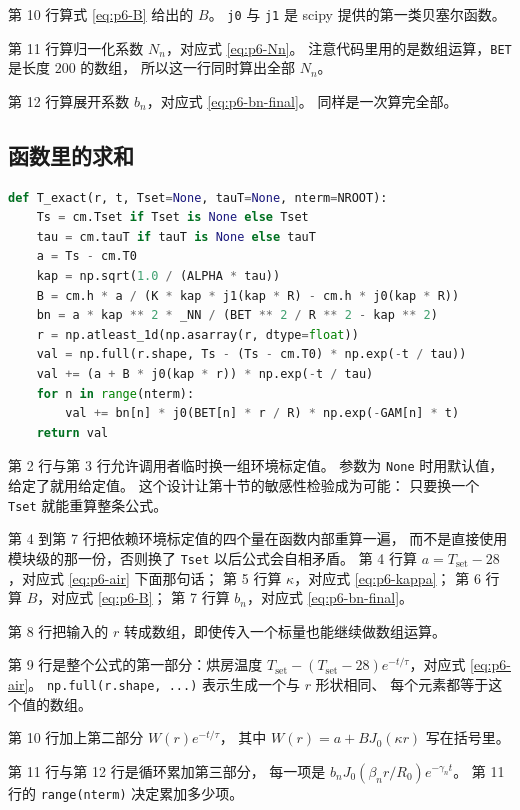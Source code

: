 第 10 行算式 \eqref{eq:p6-B} 给出的 $B$。
\texttt{j0} 与 \texttt{j1} 是 scipy 提供的第一类贝塞尔函数。

第 11 行算归一化系数 $N_n$，对应式 \eqref{eq:p6-Nn}。
注意代码里用的是数组运算，\texttt{BET} 是长度 $200$ 的数组，
所以这一行同时算出全部 $N_n$。

第 12 行算展开系数 $b_n$，对应式 \eqref{eq:p6-bn-final}。
同样是一次算完全部。

\subsection{函数里的求和}

\begin{lstlisting}[language=Python]
def T_exact(r, t, Tset=None, tauT=None, nterm=NROOT):
    Ts = cm.Tset if Tset is None else Tset
    tau = cm.tauT if tauT is None else tauT
    a = Ts - cm.T0
    kap = np.sqrt(1.0 / (ALPHA * tau))
    B = cm.h * a / (K * kap * j1(kap * R) - cm.h * j0(kap * R))
    bn = a * kap ** 2 * _NN / (BET ** 2 / R ** 2 - kap ** 2)
    r = np.atleast_1d(np.asarray(r, dtype=float))
    val = np.full(r.shape, Ts - (Ts - cm.T0) * np.exp(-t / tau))
    val += (a + B * j0(kap * r)) * np.exp(-t / tau)
    for n in range(nterm):
        val += bn[n] * j0(BET[n] * r / R) * np.exp(-GAM[n] * t)
    return val
\end{lstlisting}

第 2 行与第 3 行允许调用者临时换一组环境标定值。
参数为 \texttt{None} 时用默认值，给定了就用给定值。
这个设计让第十节的敏感性检验成为可能：
只要换一个 \texttt{Tset} 就能重算整条公式。

第 4 到第 7 行把依赖环境标定值的四个量在函数内部重算一遍，
而不是直接使用模块级的那一份，否则换了 \texttt{Tset} 以后公式会自相矛盾。
第 4 行算 $a=T_{\mathrm{set}}-28$，对应式 \eqref{eq:p6-air} 下面那句话；
第 5 行算 $\kappa$，对应式 \eqref{eq:p6-kappa}；
第 6 行算 $B$，对应式 \eqref{eq:p6-B}；
第 7 行算 $b_n$，对应式 \eqref{eq:p6-bn-final}。

第 8 行把输入的 $r$ 转成数组，即使传入一个标量也能继续做数组运算。

第 9 行是整个公式的第一部分：烘房温度
$T_{\mathrm{set}}-(T_{\mathrm{set}}-28)e^{-t/\tau}$，对应式 \eqref{eq:p6-air}。
\texttt{np.full(r.shape, ...)} 表示生成一个与 $r$ 形状相同、
每个元素都等于这个值的数组。

第 10 行加上第二部分 $W(r)e^{-t/\tau}$，
其中 $W(r)=a+BJ_0(\kappa r)$ 写在括号里。

第 11 行与第 12 行是循环累加第三部分，
每一项是 $b_nJ_0(\beta_nr/R_0)e^{-\gamma_nt}$。
第 11 行的 \texttt{range(nterm)} 决定累加多少项。

